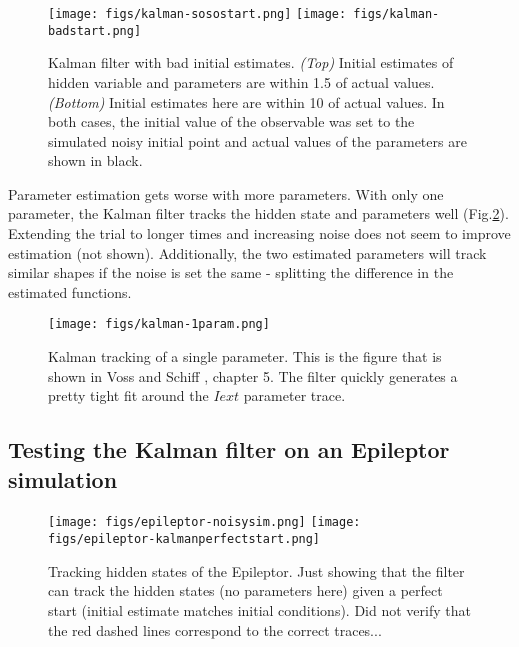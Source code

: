 \documentclass[11pt]{article}
\begin{document}
			\begin{figure}[htbp!]
			\texttt{[image: figs/kalman-sosostart.png]}
			\texttt{[image: figs/kalman-badstart.png]}
			\caption{Kalman filter with bad initial estimates. \textit{(Top)} Initial estimates of hidden variable and parameters are within 1.5 of actual values. \textit{(Bottom)} Initial estimates here are within 10 of actual values. In both cases, the initial value of the observable was set to the simulated noisy initial point and actual values of the parameters are shown in black.}
			\label{fig:kalman_badstarts}
			\end{figure}

			Parameter estimation gets worse with more parameters. With only one parameter, the Kalman filter tracks the hidden state and parameters well (Fig.\ref{fig:kalman_1param}). Extending the trial to longer times and increasing noise does not seem to improve estimation (not shown). Additionally, the two estimated parameters will track similar shapes if the noise is set the same - splitting the difference in the estimated functions.

			\begin{figure}[htbp!]
			\texttt{[image: figs/kalman-1param.png]}
			\caption{Kalman tracking of a single parameter. This is the figure that is shown in Voss \cite{Voss:2004aa} and Schiff \cite{Schiff:2012aa}, chapter 5. The filter quickly generates a pretty tight fit around the $Iext$ parameter trace.}
			\label{fig:kalman_1param}
			\end{figure}


		\subsection{Testing the Kalman filter on an Epileptor simulation} %
			\label{sub:testing_the_kalman_filter_on_an_epileptor_simulation}
			\begin{figure}[htbp!]
			\texttt{[image: figs/epileptor-noisysim.png]}
			\texttt{[image: figs/epileptor-kalmanperfectstart.png]}
			\caption{Tracking hidden states of the Epileptor. Just showing that the filter can track the hidden states (no parameters here) given a perfect start (initial estimate matches initial conditions). Did not verify that the red dashed lines correspond to the correct traces...}
			\label{fig:epileptor_kalman_noparams}
			\end{figure}
\end{document}

